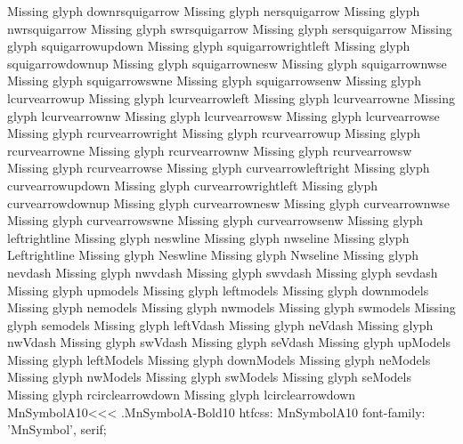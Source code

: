 Missing glyph	downrsquigarrow
Missing glyph	nersquigarrow
Missing glyph	nwrsquigarrow
Missing glyph	swrsquigarrow
Missing glyph	sersquigarrow
Missing glyph	squigarrowupdown
Missing glyph	squigarrowrightleft
Missing glyph	squigarrowdownup
Missing glyph	squigarrownesw
Missing glyph	squigarrownwse
Missing glyph	squigarrowswne
Missing glyph	squigarrowsenw
Missing glyph	lcurvearrowup
Missing glyph	lcurvearrowleft
Missing glyph	lcurvearrowne
Missing glyph	lcurvearrownw
Missing glyph	lcurvearrowsw
Missing glyph	lcurvearrowse
Missing glyph	rcurvearrowright
Missing glyph	rcurvearrowup
Missing glyph	rcurvearrowne
Missing glyph	rcurvearrownw
Missing glyph	rcurvearrowsw
Missing glyph	rcurvearrowse
Missing glyph	curvearrowleftright
Missing glyph	curvearrowupdown
Missing glyph	curvearrowrightleft
Missing glyph	curvearrowdownup
Missing glyph	curvearrownesw
Missing glyph	curvearrownwse
Missing glyph	curvearrowswne
Missing glyph	curvearrowsenw
Missing glyph	leftrightline
Missing glyph	neswline
Missing glyph	nwseline
Missing glyph	Leftrightline
Missing glyph	Neswline
Missing glyph	Nwseline
Missing glyph	nevdash
Missing glyph	nwvdash
Missing glyph	swvdash
Missing glyph	sevdash
Missing glyph	upmodels
Missing glyph	leftmodels
Missing glyph	downmodels
Missing glyph	nemodels
Missing glyph	nwmodels
Missing glyph	swmodels
Missing glyph	semodels
Missing glyph	leftVdash
Missing glyph	neVdash
Missing glyph	nwVdash
Missing glyph	swVdash
Missing glyph	seVdash
Missing glyph	upModels
Missing glyph	leftModels
Missing glyph	downModels
Missing glyph	neModels
Missing glyph	nwModels
Missing glyph	swModels
Missing glyph	seModels
Missing glyph	rcirclearrowdown
Missing glyph	lcirclearrowdown
\<MnSymbolA10\><<<
.MnSymbolA-Bold10
htfcss:  MnSymbolA10  font-family: 'MnSymbol', serif;

